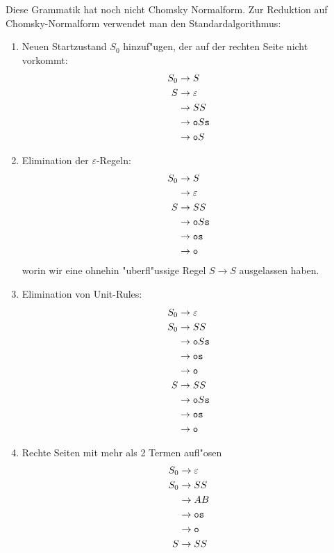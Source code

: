 \begin{loesung}
Diese Grammatik hat noch nicht Chomsky Normalform. Zur Reduktion auf
Chomsky-Normalform verwendet man den Standardalgorithmus:
\begin{enumerate}
\item Neuen Startzustand $S_0$ hinzuf"ugen, der auf der rechten Seite
nicht vorkommt:
\begin{align*}
S_0&\rightarrow S\\
S&\rightarrow \varepsilon\\
 &\rightarrow SS\\
 &\rightarrow {\tt o}S{\tt s}\\
 &\rightarrow {\tt o}S
\end{align*}
\item Elimination der $\varepsilon$-Regeln:
\begin{align*}
S_0&\rightarrow S\\
   &\rightarrow \varepsilon\\
S&\rightarrow SS\\
 &\rightarrow {\tt o}S{\tt s}\\
 &\rightarrow {\tt o}{\tt s}\\
 &\rightarrow {\tt o}
\end{align*}
worin wir eine ohnehin "uberfl"ussige Regel $S\rightarrow S$
ausgelassen haben.
\item Elimination von Unit-Rules:
\begin{align*}
S_0&\rightarrow \varepsilon\\
S_0&\rightarrow SS\\
   &\rightarrow {\tt o}S{\tt s}\\
   &\rightarrow {\tt o}{\tt s}\\
   &\rightarrow {\tt o}\\
S&\rightarrow SS\\
 &\rightarrow {\tt o}S{\tt s}\\
 &\rightarrow {\tt o}{\tt s}\\
 &\rightarrow {\tt o}
\end{align*}
\item Rechte Seiten mit mehr als 2 Termen aufl"osen
\begin{align*}
S_0&\rightarrow \varepsilon\\
S_0&\rightarrow SS\\
   &\rightarrow AB\\
   &\rightarrow {\tt o}{\tt s}\\
   &\rightarrow {\tt o}\\
S&\rightarrow SS\\

\end{align*}
\end{enumerate}
\end{loesung}

